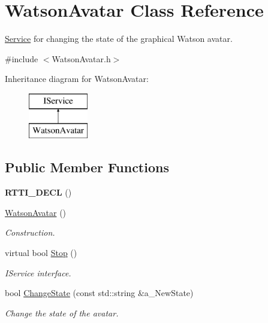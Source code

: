 \hypertarget{class_watson_avatar}{}\section{Watson\+Avatar Class Reference}
\label{class_watson_avatar}


\hyperlink{struct_service}{Service} for changing the state of the graphical Watson avatar.  




{\ttfamily \#include $<$Watson\+Avatar.\+h$>$}

Inheritance diagram for Watson\+Avatar\+:\begin{figure}[H]
\begin{center}
\leavevmode
\includegraphics[height=2.000000cm]{class_watson_avatar}
\end{center}
\end{figure}
\subsection*{Public Member Functions}
\begin{DoxyCompactItemize}
\item 
\mbox{\label{class_watson_avatar_aeb3d360ac60329216450032a49c14881}} 
{\bfseries R\+T\+T\+I\+\_\+\+D\+E\+CL} ()
\item 
\mbox{\label{class_watson_avatar_a943056935942ec9690813393f9d79f0d}} 
\hyperlink{class_watson_avatar_a943056935942ec9690813393f9d79f0d}{Watson\+Avatar} ()
\begin{DoxyCompactList}\small\item\em Construction. \end{DoxyCompactList}\item 
\mbox{\label{class_watson_avatar_a3ec9780ff947025a5803dc68a6503d11}} 
virtual bool \hyperlink{class_watson_avatar_a3ec9780ff947025a5803dc68a6503d11}{Stop} ()
\begin{DoxyCompactList}\small\item\em I\+Service interface. \end{DoxyCompactList}\item 
\mbox{\label{class_watson_avatar_a9cc5e7815eed850fe3fdea88ba198dbe}} 
bool \hyperlink{class_watson_avatar_a9cc5e7815eed850fe3fdea88ba198dbe}{Change\+State} (const std\+::string \&a\+\_\+\+New\+State)
\begin{DoxyCompactList}\small\item\em Change the state of the avatar. \end{DoxyCompactList}\end{DoxyCompactItemize}


